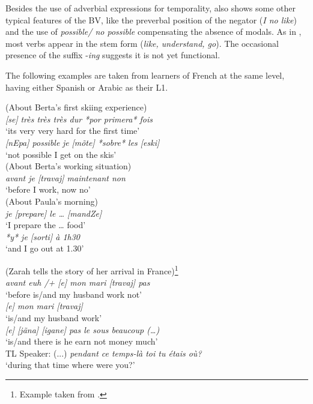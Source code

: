 \documentclass[output=paper]{langscibook}
\begin{document}
Besides the use of adverbial expressions for temporality,  also shows some other typical features of the BV, like the preverbal position of the negator (\textit{I no like}) and the use of \textit{possible/ no possible} compensating the absence of modals. As in , most verbs appear in the stem form (\textit{like, understand, go}). The occasional presence of the suffix -\textit{ing} suggests it is not yet functional.

The following examples are taken from learners of French at the same level, having either Spanish  or Arabic  as their L1.

\ea%
    \label{ex:benazzo:3}
    \ea\label{ex:benazzo:3a} (About Berta’s first skiing experience) \\
    \hspace{2ex}  {\textit{[se]} \textit{très très très dur *por primera* fois}}\\
      {} {‘its very very hard for the first time’}\\
      {}  {\textit{[nEpa] possible} \textit{je} \textit{[mõte] *sobre* les [eski]}}\\
      {} {‘not possible I get on the skis’}\\

    \ex\label{ex:benazzo:3b} (About Berta’s working situation)\\
    \hspace{2ex}  \textit{avant je [travaj] maintenant non}\\
        {} {‘before I work, now no’}\\
    \ex\label{ex:benazzo:3c} (About Paula’s morning)  \\
     \textit{je [prepare] le … [mandZe]}\\
     {} {‘I prepare the … food’}\\
    {} {\textit{*y* je  [sorti] à 1h30}}\\
    {} {‘and I go out at 1.30’}\\
\z
\z
    
\ea%
    \label{ex:benazzo:4}
    (Zarah tells the story of her arrival in France)\footnote{{Example taken from \citet[42--43]{Véronique2000}.}}\\
   \textit{avant euh /+ [e] mon mari [travaj] pas}\\
     {} {`before is/and my husband work not'}\\
    {} \textit{[e] mon mari [travaj]}\\
     {} {`is/and my husband work'}\\
    {} \textit{[e] [jãna] [igane] pas le sous beaucoup (…)}\\
    {} {`is/and there is he earn not money much'}\\
    {TL Speaker:} {(...) \textit{pendant ce temps-là toi tu étais où?}}\\
    {}  {`during that time where were you?'}\\
    
\end{document}
